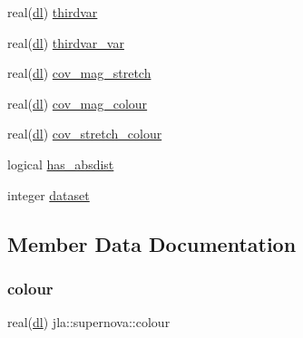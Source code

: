 \begin{DoxyCompactItemize}
\item 
real(\mbox{\hyperlink{namespacejla_a3aa6435b4e08f1d532390186ac608741}{dl}}) \mbox{\hyperlink{structjla_1_1supernova_a803d618e49183820a0edd4dfc9ca0551}{thirdvar}}
\item 
real(\mbox{\hyperlink{namespacejla_a3aa6435b4e08f1d532390186ac608741}{dl}}) \mbox{\hyperlink{structjla_1_1supernova_ab0b5176f0bd19f62fea30621e42bc54c}{thirdvar\+\_\+var}}
\item 
real(\mbox{\hyperlink{namespacejla_a3aa6435b4e08f1d532390186ac608741}{dl}}) \mbox{\hyperlink{structjla_1_1supernova_a5099d4158f3659ac0cd3e9c9df28583e}{cov\+\_\+mag\+\_\+stretch}}
\item 
real(\mbox{\hyperlink{namespacejla_a3aa6435b4e08f1d532390186ac608741}{dl}}) \mbox{\hyperlink{structjla_1_1supernova_a3ced6c04f884d5659730f1fd8f960c2e}{cov\+\_\+mag\+\_\+colour}}
\item 
real(\mbox{\hyperlink{namespacejla_a3aa6435b4e08f1d532390186ac608741}{dl}}) \mbox{\hyperlink{structjla_1_1supernova_a2c527ec60d225816f110da0cfefe0a2f}{cov\+\_\+stretch\+\_\+colour}}
\item 
logical \mbox{\hyperlink{structjla_1_1supernova_a3dcf3280b618bf79020f094396720fd1}{has\+\_\+absdist}}
\item 
integer \mbox{\hyperlink{structjla_1_1supernova_a35c127d4a3ae76877d9cda65334904d9}{dataset}}
\end{DoxyCompactItemize}


\subsection{Member Data Documentation}
\mbox{\label{structjla_1_1supernova_a65403d92879e2f75e208f52c742635b9}} 
\subsubsection{\texorpdfstring{colour}{colour}}
{\footnotesize\ttfamily real(\mbox{\hyperlink{namespacejla_a3aa6435b4e08f1d532390186ac608741}{dl}}) jla\+::supernova\+::colour\hspace{0.3cm}{\ttfamily [private]}}

\mbox{\label{structjla_1_1supernova_ae2cb31c13b11e89055408af5df3627bd}} 
